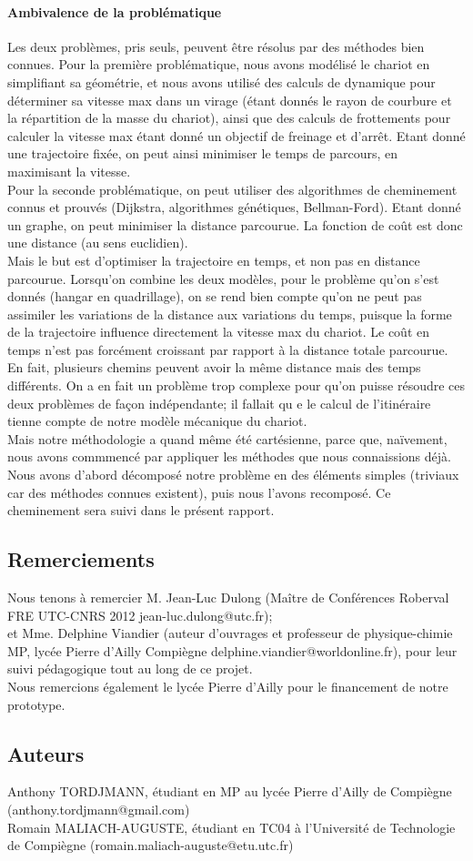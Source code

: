 \paragraph{Ambivalence de la problématique}
Les deux problèmes, pris seuls, peuvent être résolus par des méthodes bien connues. Pour la première problématique, nous avons modélisé le chariot en simplifiant sa géométrie, et nous avons utilisé des calculs de dynamique pour déterminer sa vitesse max dans un virage (étant donnés le rayon de courbure et la répartition de la masse du chariot), ainsi que des calculs de frottements pour calculer la vitesse max étant donné un objectif de freinage et d'arrêt. Etant donné une trajectoire fixée, on peut ainsi minimiser le temps de parcours, en maximisant la vitesse.\\
Pour la seconde problématique, on peut utiliser des algorithmes de cheminement connus et prouvés (Dijkstra, algorithmes génétiques, Bellman-Ford). Etant donné un graphe, on peut minimiser la distance parcourue. La fonction de coût est donc une distance (au sens euclidien).\\
Mais le but est d'optimiser la trajectoire en temps, et non pas en distance parcourue. Lorsqu'on combine les deux modèles, pour le problème qu'on s'est donnés (hangar en quadrillage), on se rend bien compte qu'on ne peut pas assimiler les variations de la distance aux variations du temps, puisque la forme de la trajectoire influence directement la vitesse max du chariot. Le coût en temps n'est pas forcément croissant par rapport à la distance totale parcourue. En fait, plusieurs chemins peuvent avoir la même distance mais des temps différents. On a en fait un problème trop complexe pour qu'on puisse résoudre ces deux problèmes de façon indépendante; il fallait qu e le calcul de l'itinéraire tienne compte de notre modèle mécanique du chariot.\\
Mais notre méthodologie a quand même été cartésienne, parce que, naïvement, nous avons commmencé par appliquer les méthodes que nous connaissions déjà. Nous avons d'abord décomposé notre problème en des éléments simples (triviaux car des méthodes connues existent), puis nous l'avons recomposé. Ce cheminement sera suivi dans le présent rapport.

\subsection{Remerciements}
Nous tenons à remercier M. Jean-Luc Dulong (Maître de Conférences Roberval FRE UTC-CNRS 2012 jean-luc.dulong@utc.fr);\\
et Mme. Delphine Viandier (auteur d'ouvrages et professeur de physique-chimie MP, lycée Pierre d'Ailly Compiègne delphine.viandier@worldonline.fr), pour leur suivi pédagogique tout au long de ce projet.\\
Nous remercions également le lycée Pierre d'Ailly pour le financement de notre prototype.\\
\subsection{Auteurs}
Anthony TORDJMANN, étudiant en MP au lycée Pierre d'Ailly de Compiègne (anthony.tordjmann@gmail.com)\\
Romain MALIACH-AUGUSTE, étudiant en TC04 à l'Université de Technologie de Compiègne (romain.maliach-auguste@etu.utc.fr)
